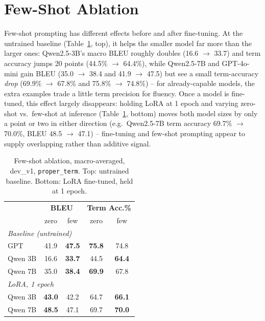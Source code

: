 \documentclass[11pt]{article}
\begin{document}
\section{Few-Shot Ablation}
\label{sec:exp-few-shot}

Few-shot prompting has different effects before and after fine-tuning. At the untrained baseline (Table~\ref{tab:few-shot}, top), it helps the smaller model far more than the larger ones: Qwen2.5-3B's macro BLEU roughly doubles (16.6 $\to$ 33.7) and term accuracy jumps 20 points (44.5\% $\to$ 64.4\%), while Qwen2.5-7B and GPT-4o-mini gain BLEU (35.0 $\to$ 38.4 and 41.9 $\to$ 47.5) but see a small term-accuracy \emph{drop} (69.9\% $\to$ 67.8\% and 75.8\% $\to$ 74.8\%) -- for already-capable models, the extra examples trade a little term precision for fluency. Once a model is fine-tuned, this effect largely disappears: holding LoRA at 1 epoch and varying zero-shot vs.\ few-shot at inference (Table~\ref{tab:few-shot}, bottom) moves both model sizes by only a point or two in either direction (e.g.\ Qwen2.5-7B term accuracy 69.7\% $\to$ 70.0\%, BLEU 48.5 $\to$ 47.1) -- fine-tuning and few-shot prompting appear to supply overlapping rather than additive signal.

\begin{table}[t]
  \centering
  \small
  \begin{tabular}{lcccc}
    \hline
    & \multicolumn{2}{c}{\textbf{BLEU}} & \multicolumn{2}{c}{\textbf{Term Acc.\%}} \\
    & zero & few & zero & few \\
    \hline
    \multicolumn{5}{l}{\emph{Baseline (untrained)}} \\
    GPT        & 41.9 & \textbf{47.5} & \textbf{75.8} & 74.8 \\
    Qwen 3B    & 16.6 & \textbf{33.7} & 44.5 & \textbf{64.4} \\
    Qwen 7B    & 35.0 & \textbf{38.4} & \textbf{69.9} & 67.8 \\
    \hline
    \multicolumn{5}{l}{\emph{LoRA, 1 epoch}} \\
    Qwen 3B    & \textbf{43.0} & 42.2 & 64.7 & \textbf{66.1} \\
    Qwen 7B    & \textbf{48.5} & 47.1 & 69.7 & \textbf{70.0} \\
    \hline
  \end{tabular}
  \caption{Few-shot ablation, macro-averaged, dev\_v1, \texttt{proper\_term}. Top: untrained baseline. Bottom: LoRA fine-tuned, held at 1 epoch.}
  \label{tab:few-shot}
\end{table}
\end{document}
